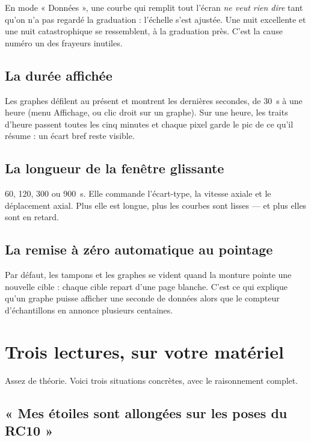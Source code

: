 \documentclass[a4paper,11pt,twoside]{report}
\begin{document}
\begin{warning}
En mode « Données », une courbe qui remplit tout l'écran \emph{ne veut rien
dire} tant qu'on n'a pas regardé la graduation : l'échelle s'est ajustée. Une
nuit excellente et une nuit catastrophique se ressemblent, à la graduation
près. C'est la cause numéro un des frayeurs inutiles.
\end{warning}

\section{La durée affichée}

Les graphes défilent au présent et montrent les dernières secondes, de
\SI{30}{\second} à une heure (menu Affichage, ou clic droit sur un graphe).
Sur une heure, les traits d'heure passent toutes les cinq minutes et chaque
pixel garde le pic de ce qu'il résume : un écart bref reste visible.

\section{La longueur de la fenêtre glissante}

60, 120, 300 ou \SI{900}{\second}. Elle commande l'écart-type, la vitesse
axiale et le déplacement axial. Plus elle est longue, plus les courbes sont
lisses --- et plus elles sont en retard.

\section{La remise à zéro automatique au pointage}

Par défaut, les tampons et les graphes se vident quand la monture pointe une
nouvelle cible : chaque cible repart d'une page blanche. C'est ce qui
explique qu'un graphe puisse afficher une seconde de données alors que le
compteur d'échantillons en annonce plusieurs centaines.

\chapter{Trois lectures, sur votre matériel}

Assez de théorie. Voici trois situations concrètes, avec le raisonnement
complet.

\section{« Mes étoiles sont allongées sur les poses du RC10 »}
\end{document}
